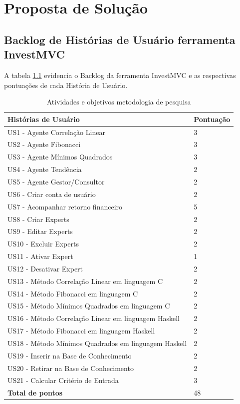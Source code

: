\chapter{Proposta de Solução}

\section{Backlog de Histórias de Usuário ferramenta InvestMVC}

A tabela \ref{backlog} evidencia o Backlog da ferramenta InvestMVC e as respectivas pontuações de cada História de Usuário.

\begin{table}[htp]
\caption{Atividades e objetivos metodologia de pesquisa}
\begin{center}
    \begin{tabular}{ | p{9cm} | p{5cm} |}
    \hline
    \textbf{Histórias de Usuário} & \textbf{Pontuação} \\ \hline

US1 - Agente Correlação Linear & 3\\ \hline
US2 - Agente Fibonacci & 3 \\ \hline
US3 - Agente Mínimos Quadrados & 3\\ \hline
US4 -  Agente Tendência & 2 \\ \hline
US5 - Agente Gestor/Consultor & 2\\ \hline
US6 - Criar conta de usuário & 2\\ \hline
US7 - Acompanhar retorno financeiro & 5\\ \hline
US8 - Criar Experts & 2\\ \hline
US9 - Editar Experts & 2\\ \hline
US10 - Excluir Experts & 2\\ \hline
US11 - Ativar Expert & 1\\ \hline
US12 - Desativar Expert & 2 \\ \hline
US13 - Método Correlação Linear em linguagem C & 2\\ \hline
US14 - Método Fibonacci em linguagem C & 2\\ \hline
US15 - Método Mínimos Quadrados em linguagem C & 2\\ \hline
US16 - Método Correlação Linear em linguagem Haskell & 2\\ \hline
US17 - Método Fibonacci em linguagem Haskell & 2\\ \hline
US18 - Método Mínimos Quadrados em linguagem Haskell & 2\\ \hline
US19 - Inserir na Base de Conhecimento & 2\\ \hline
US20 - Retirar na Base de Conhecimento & 2\\ \hline
US21 - Calcular Critério de Entrada & 3\\ \hline
\textbf{Total de pontos} & 48\\ \hline
\end{tabular}
\end{center}
\label{backlog}
\end{table}

